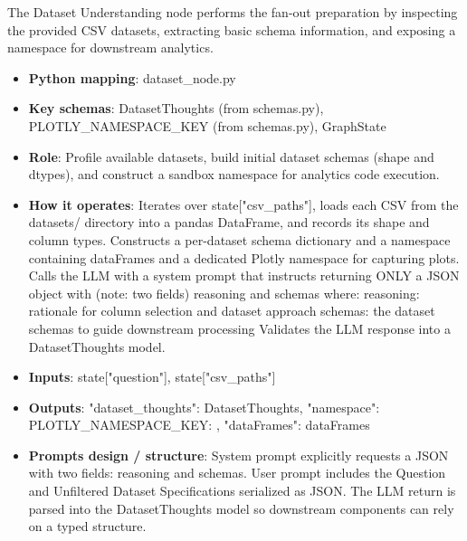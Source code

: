 The Dataset Understanding node performs the fan-out preparation by inspecting the provided CSV datasets, extracting basic schema information, and exposing a namespace for downstream analytics.

\begin{itemize}
  \item \textbf{Python mapping}: dataset\_node.py
  \item \textbf{Key schemas}: DatasetThoughts (from schemas.py), PLOTLY\_NAMESPACE\_KEY (from schemas.py), GraphState
  \item \textbf{Role}: Profile available datasets, build initial dataset schemas (shape and dtypes), and construct a sandbox namespace for analytics code execution.
  \item \textbf{How it operates}:
    \subitem Iterates over state["csv\_paths"], loads each CSV from the datasets/ directory into a pandas DataFrame, and records its shape and column types.
    \subitem Constructs a per-dataset schema dictionary and a namespace containing dataFrames and a dedicated Plotly namespace for capturing plots.
    \subitem Calls the LLM with a system prompt that instructs returning ONLY a JSON object with {
    (note: two fields) reasoning and schemas } where:
    \subitem reasoning: rationale for column selection and dataset approach
    \subitem schemas: the dataset schemas to guide downstream processing
    \subitem Validates the LLM response into a DatasetThoughts model.
  \item \textbf{Inputs}: state["question"], state["csv\_paths"]
  \item \textbf{Outputs}: {"dataset\_thoughts": DatasetThoughts, "namespace": {PLOTLY\_NAMESPACE\_KEY: {}, "dataFrames": dataFrames}}
  \item \textbf{Prompts design / structure}:
    \subitem System prompt explicitly requests a JSON with two fields: reasoning and schemas.
    \subitem User prompt includes the Question and Unfiltered Dataset Specifications serialized as JSON.
    \subitem The LLM return is parsed into the DatasetThoughts model so downstream components can rely on a typed structure.
\end{itemize}
